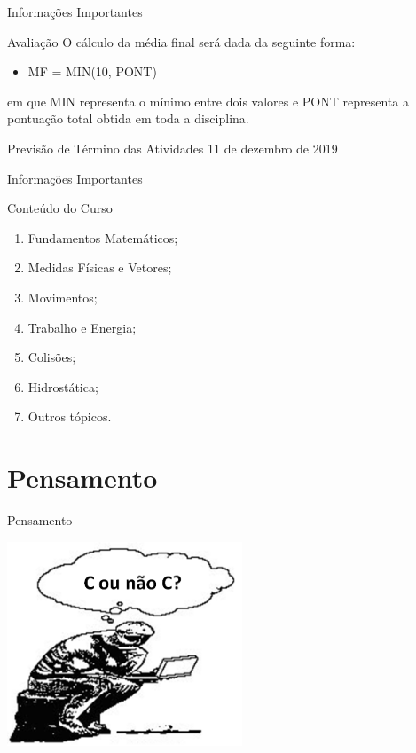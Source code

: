 \documentclass[xcolor=dvipsnames,table]{beamer}
\begin{document}
	\begin{frame}{Informações Importantes}
		\begin{block}{Avaliação}
			O cálculo da média final será dada da seguinte forma:
			\begin{itemize}
				\item MF = MIN(10, PONT)
			\end{itemize}
			em que MIN representa o mínimo entre dois valores e PONT representa a pontuação total obtida em toda a disciplina.
		\end{block} \pause
		\begin{exampleblock}{Previsão de Término das Atividades}
			11 de dezembro de 2019
		\end{exampleblock}
	\end{frame}
	
	\begin{frame}{Informações Importantes}
		\begin{block}{Conteúdo do Curso}
			\begin{enumerate}
				\item Fundamentos Matemáticos;
				\item Medidas Físicas e Vetores;
				\item Movimentos;
				\item Trabalho e Energia;
				\item Colisões;
				\item Hidrostática;
				\item Outros tópicos.
			\end{enumerate}
		\end{block}
	\end{frame}

	\section{Pensamento}
	\begin{frame}{Pensamento}
  		\begin{center}
    		\includegraphics[width=7cm]{images/pensamento.png}
  		\end{center}
	\end{frame}
	
\end{document}
